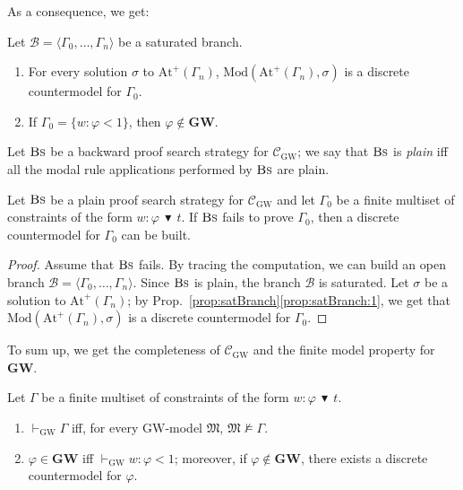 \documentclass[copyright,creativecommons]{eptcs}
\newcommand{\GWL}{\mathbf{GW}}
\newcommand{\GWM}{\mbox{$\mathrm{GW}$}}
\newcommand{\Calcw}{\Ccal_{\mathrm{GW}}}
\newcommand{\stru}[1]{\langle #1 \rangle} %
\newcommand{\abstractorder}{\,\blacktriangledown\,}%
\newcommand{\provesw}[1]{\vdash_{\mathrm{GW}} #1}
\newcommand{\Atmp}[1]{\mathrm{At}^{+}\!(#1)}
\newcommand{\Bs}{\mbox{\textsc{Bs}}}
\newcommand{\Modname}{\mathrm{Mod}}
\newcommand{\Mod}[1]{\Modname(#1)}
\newcommand{\M}{\mathfrak{M}}
\newcommand{\s}{\sigma}
\newcommand{\G}{\Gamma}
\newcommand{\Bcal}{\mathcal{B}}
\newcommand{\Ccal}{\mathcal{C}}
\begin{document}
\noindent
As a consequence, we get:
\begin{proposition}\label{prop:satBranch}
  Let $\Bcal=\stru{\G_0,\dots,\G_n}$ be a saturated branch.
  \begin{enumerate}[label=(\roman*), ref=(\roman*),leftmargin=*]
  \item\label{prop:satBranch:1} For every solution  $\s$  to
    $\Atmp{\G_n}$, $\Mod{\Atmp{\G_n},\s}$ is a discrete
    countermodel for $\G_0$.
      
  \item\label{prop:satBranch:2} If $\G_0=\{ w : \varphi < 1\}$, then
    $\varphi\not\in\GWL$.
  \end{enumerate}
\end{proposition}

\noindent
Let $\Bs$ be a backward proof search strategy for $\Calcw$; we say
that $\Bs$ is \emph{plain} iff all the modal rule applications
performed by $\Bs$ are plain.


\begin{lemma}\label{lemma:search}
  Let $\Bs$ be a plain proof search strategy for $\Calcw$ and let
  $\G_0$ be a finite multiset of constraints of the form
  $w:\varphi\abstractorder t$.  If $\Bs$ fails to prove $\G_0$, then a
  discrete countermodel for $\G_0$ can be built.
\end{lemma}

\begin{proof}
  Assume that $\Bs$ fails.  By tracing the computation, we can build
  an open branch $\Bcal=\stru{\G_0,\dots,\G_n}$.  Since $\Bs$ is
  plain, the branch $\Bcal$ is saturated.  Let $\s$ be a solution to
  $\Atmp{\G_n}$; by Prop.~\ref{prop:satBranch}\ref{prop:satBranch:1},
  we get that $\Mod{\Atmp{\G_n},\s}$ is a discrete countermodel for
  $\G_0$.
\end{proof}

\noindent
To sum up, we get the completeness of $\Calcw$ and the finite model
property for $\GWL$.



\begin{proposition}[Completeness]\label{prop:compl}
  Let $\G$ be a finite multiset of constraints of the form
  $w:\varphi\abstractorder t$.
  \begin{enumerate}[label=(\roman*), ref=(\roman*),leftmargin=*]    
  \item\label{prop:compl:1}
    $\provesw{\Gamma}$ iff, for every \GWM-model  $\M$,  $\M\not\models\G$.

    
  \item\label{prop:compl2}
    $\varphi\in\GWL$ iff  $\provesw w:\varphi < 1$; moreover, if
    $\varphi\not\in\GWL$, 
    there exists a discrete countermodel for $\varphi$.
\end{enumerate}
\end{proposition}
\end{document}
